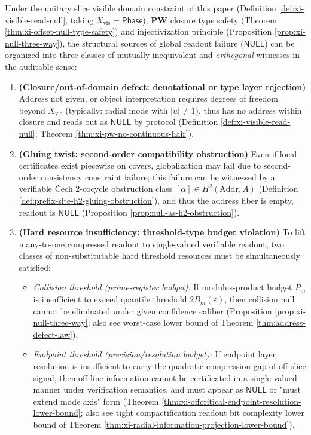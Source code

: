 \begin{theorem}\label{thm:xi-null-orthogonal-trichotomy-resource-nonsubstitutable}
Under the unitary slice visible domain constraint of this paper (Definition \ref{def:xi-visible-read-null}, taking \(X_{\mathrm{vis}}=\mathsf{Phase}\)), \(\mathbf{PW}\) closure type safety (Theorem \ref{thm:xi-offset-null-type-safety}) and injectivization principle (Proposition \ref{prop:xi-null-three-way}), the structural sources of global readout failure (\(\mathsf{NULL}\)) can be organized into three classes of mutually inequivalent and \emph{orthogonal} witnesses in the auditable sense:
\begin{enumerate}
  \item \textbf{(Closure/out-of-domain defect: denotational or type layer rejection)} Address not given, or object interpretation requires degrees of freedom beyond \(X_{\mathrm{vis}}\) (typically: radial mode with \(|u|\neq 1\)), thus has no address within closure and reads out as \(\mathsf{NULL}\) by protocol (Definition \ref{def:xi-visible-read-null}; Theorem \ref{thm:xi-pw-no-continuous-hair}).
  \item \textbf{(Gluing twist: second-order compatibility obstruction)} Even if local certificates exist piecewise on covers, globalization may fail due to second-order consistency constraint failure; this failure can be witnessed by a verifiable Čech \(2\)-cocycle obstruction class \([\alpha]\in H^2(\mathrm{Addr},A)\) (Definition \ref{def:prefix-site-h2-gluing-obstruction}), and thus the address fiber is empty, readout is \(\mathsf{NULL}\) (Proposition \ref{prop:null-as-h2-obstruction}).
  \item \textbf{(Hard resource insufficiency: threshold-type budget violation)} To lift many-to-one compressed readout to single-valued verifiable readout, two classes of non-substitutable hard threshold resources must be simultaneously satisfied:
  \begin{itemize}
    \item \emph{Collision threshold (prime-register budget):} If modulus-product budget \(P_m\) is insufficient to exceed quantile threshold \(2B_m(\varepsilon)\), then collision null cannot be eliminated under given confidence caliber (Proposition \ref{prop:xi-null-three-way}; also see worst-case lower bound of Theorem \ref{thm:address-defect-law}).
    \item \emph{Endpoint threshold (precision/resolution budget):} If endpoint layer resolution is insufficient to carry the quadratic compression gap of off-slice signal, then off-line information cannot be certificated in a single-valued manner under verification semantics, and must appear as \(\mathsf{NULL}\) or "must extend mode axis" form (Theorem \ref{thm:xi-offcritical-endpoint-resolution-lower-bound}; also see tight compactification readout bit complexity lower bound of Theorem \ref{thm:xi-radial-information-projection-lower-bound}).

\end{itemize}
\end{enumerate}
\end{theorem}
